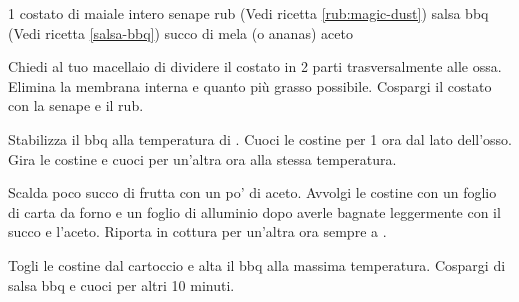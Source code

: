 \begin{ingreds}
	1 costato di maiale intero 
	senape 
	rub (Vedi ricetta \ref{rub:magic-dust}) 
	salsa bbq (Vedi ricetta \ref{salsa-bbq}) 
	succo di mela (o ananas) 
	aceto

\end{ingreds}

\begin{method}
Chiedi al tuo macellaio di dividere il costato in 2 parti trasversalmente alle ossa. Elimina la membrana interna e quanto più grasso possibile. Cospargi il costato con la senape e il rub.

Stabilizza il bbq alla temperatura di . Cuoci le costine per 1 ora dal lato dell'osso. Gira le costine e cuoci per un'altra ora alla stessa temperatura.

Scalda poco succo di frutta con un po' di aceto. Avvolgi le costine con un foglio di carta da forno e un foglio di alluminio dopo averle bagnate leggermente con il succo e l'aceto. Riporta in cottura per un'altra ora sempre a .

Togli le costine dal cartoccio e alta il bbq alla massima temperatura. Cospargi di salsa bbq e cuoci per altri 10 minuti.

\end{method}




